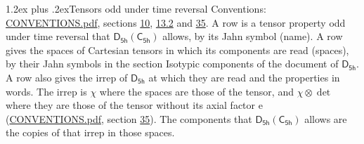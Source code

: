 \documentclass[10pt,a4paper]{article}
\makeatletter
\renewcommand\section{\@startsection{section}{1}{\z@}{-3ex plus -1ex minus -.2ex}%
  {1.2ex plus .2ex}{\normalfont\large\sffamily\bfseries\color{parttitle}}}
\numberwithin{equation}{section}
\newcommand{\grp}[1]{\mathsf{#1}}
\newcommand{\irrprod}{\otimes}
\makeatother
\begin{document}
\section{Tensors odd under time reversal}\label{s:time_odd}
Conventions: \href{../../CONVENTIONS.pdf}{CONVENTIONS.pdf}, sections \href{../../../rotation/CONVENTIONS.pdf\#conv.10}{10}, \href{../../../rotation/CONVENTIONS.pdf\#conv.13.2}{13.2} and \href{../../CONVENTIONS.pdf\#conv.35}{35}.
\leavevmode\label{n:head.name.property}A row is a tensor property odd under time reversal that $\grp{D_{5h}}(\grp{C_{5h}})$ allows, by its Jahn symbol (name). \label{n:head.spaces}A row gives the spaces of Cartesian tensors in which its components are read (spaces), by their Jahn symbols in the section Isotypic components of the document of \href{../../../rotation/data/pdf/D5h.pdf}{$\grp{D_{5h}}$}. \label{n:head.properties}A row also gives the irrep of $\grp{D_{5h}}$ at which they are read and the properties in words. The irrep is $\chi$ where the spaces are those of the tensor, and $\chi \irrprod \det$ where they are those of the tensor without its axial factor e (\href{../../CONVENTIONS.pdf}{CONVENTIONS.pdf}, section \href{../../CONVENTIONS.pdf\#conv.35}{35}). The components that $\grp{D_{5h}}(\grp{C_{5h}})$ allows are the copies of that irrep in those spaces.
\end{document}
